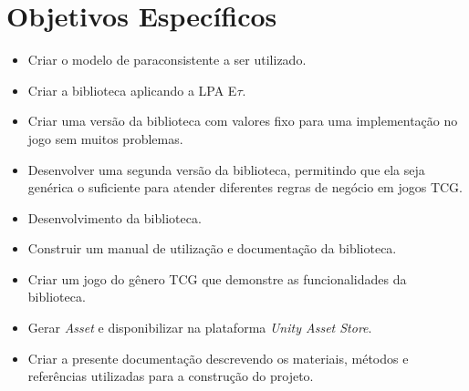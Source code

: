 \section{Objetivos Específicos}
	\begin{itemize}
		\item Criar o modelo de paraconsistente a ser utilizado.
		\item Criar a biblioteca aplicando a LPA E$\tau$.
		\item Criar uma versão da biblioteca com valores fixo para uma implementação no jogo sem muitos problemas.
		\item Desenvolver uma segunda versão da biblioteca, permitindo que ela seja genérica o suficiente para atender diferentes regras de negócio em jogos TCG.
		\item Desenvolvimento da biblioteca.
		\item Construir um manual de utilização e documentação da biblioteca.
		\item Criar um jogo do gênero TCG que demonstre as funcionalidades da biblioteca.
		\item Gerar \textit{Asset} e disponibilizar na plataforma \textit{Unity Asset Store}.
		\item Criar a presente documentação descrevendo os materiais, métodos e referências utilizadas para a construção do projeto.
	\end{itemize}



